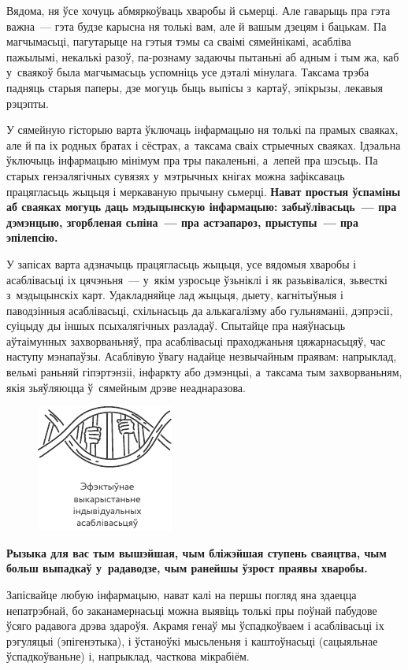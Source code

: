 Вядома, ня ўсе хочуць абмяркоўваць хваробы й сьмерці. Але гаварыць пра гэта важна~--- гэта будзе карысна ня толькі вам, але й вашым дзецям і бацькам. Па магчымасьці, пагутарыце на гэтыя тэмы са сваімі сямейнікамі, асабліва пажылымі, некалькі разоў, па-рознаму задаючы пытаньні аб адным і тым жа, каб у~сваякоў была магчымасьць успомніць усе дэталі мінулага. Таксама трэба падняць старыя паперы, дзе могуць быць выпісы з~картаў, эпікрызы, лекавыя рэцэпты.

У сямейную гісторыю варта ўключаць інфармацыю ня толькі па прамых сваяках, але й па іх родных братах і сёстрах, а~таксама сваіх стрыечных сваяках. Ідэальна ўключыць інфармацыю мінімум пра тры пакаленьні, а~лепей пра шэсьць. Па старых генэалягічных сувязях у~мэтрычных кнігах можна зафіксаваць працягласьць жыцьця і меркаваную прычыну сьмерці. \textbf{Нават простыя ўспаміны аб сваяках могуць даць мэдыцынскую інфармацыю: забыўлівасьць~--- пра дэмэнцыю, згорбленая сьпіна~--- пра астэапароз, прыступы~--- пра эпілепсію.}

У запісах варта адзначыць працягласьць жыцьця, усе вядомыя хваробы і асаблівасьці іх цячэньня~--- у~якім узросьце ўзьніклі і як разьвіваліся, зьвесткі з~мэдыцынскіх карт. Удакладняйце лад жыцьця, дыету, кагнітыўныя і паводзінныя асаблівасьці, схільнасьць да алькагалізму або гульняманіі, дэпрэсіі, суіцыду ды іншых псыхалягічных разладаў. Спытайце пра наяўнасьць аўтаімунных захворваньняў, пра асаблівасьці праходжаньня цяжарнасьцяў, час наступу мэнапаўзы. Асаблівую ўвагу надайце незвычайным праявам: напрыклад, вельмі раньняй гіпэртэнзіі, інфаркту або дэмэнцыі, а~таксама тым захворваньням, якія зьяўляюцца ў~сямейным дрэве неаднаразова.

\begin{figure}[htb!]
  \centering
  \includegraphics[scale=1.5]{willpower/ch3/1.pdf}
\end{figure}

\textbf{Рызыка для вас тым вышэйшая, чым бліжэйшая ступень сваяцтва, чым больш выпадкаў у~радаводзе, чым ранейшы ўзрост праявы хваробы.}

Запісвайце любую інфармацыю, нават калі на першы погляд яна здаецца непатрэбнай, бо заканамернасьці можна выявіць толькі пры поўнай пабудове ўсяго радавога дрэва здароўя. Акрамя генаў мы ўспадкоўваем і асаблівасьці іх рэгуляцыі (эпігенэтыка), і ўстаноўкі мысьленьня і каштоўнасьці (сацыяльнае ўспадкоўваньне) і, напрыклад, часткова мікрабіём.

